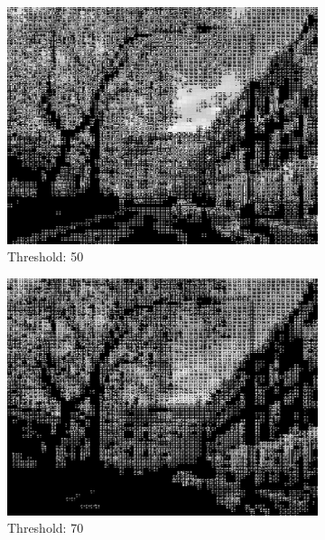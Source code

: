 \documentclass{article}
\begin{document}
\begin{figure}[htbp]
    \begin{subfigure}{0.3\textwidth}
        \centering
        \includegraphics[width=\linewidth]{RECONSTRUCTED50.jpeg}
        \caption{Threshold: 50}
    \end{subfigure}\hfill
    \begin{subfigure}{0.3\textwidth}
        \centering
        \includegraphics[width=\linewidth]{RECONSTRUCTED70.jpeg}
        \caption{Threshold: 70}
    \end{subfigure}\hfill
    \begin{subfigure}{0.3\textwidth}
        \centering

\end{subfigure}
\end{figure}
\end{document}
